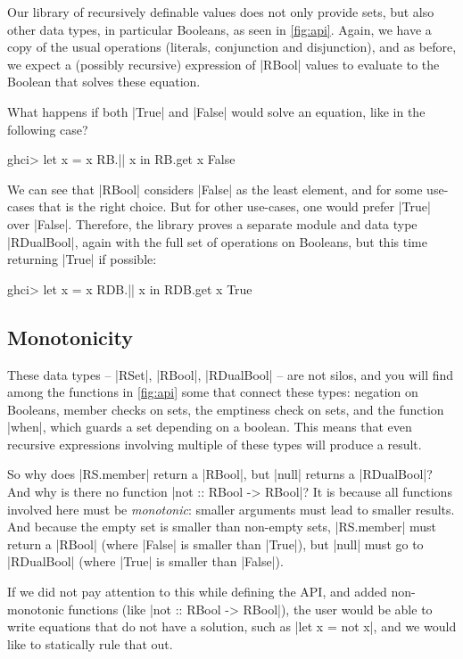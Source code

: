 \documentclass[manuscript,anonymous,screen,acmsmall]{acmart}
\begin{document}
Our library of recursively definable values does not only provide sets, but also other data types, in particular Booleans, as seen in \cref{fig:api}. Again, we have a copy of the usual operations (literals, conjunction and disjunction), and as before, we expect a (possibly recursive) expression of |RBool| values to evaluate to the Boolean that solves these equation.

What happens if both |True| and |False| would solve an equation, like in the following case?
\begin{code}
ghci> let x = x RB.|| x in RB.get x
False
\end{code}
We can see that |RBool| considers |False| as the least element, and for some use-cases that is the right choice. But for other use-cases, one would prefer |True| over |False|. Therefore, the library proves a separate module and data type |RDualBool|, again with the full set of operations on Booleans, but this time returning |True| if possible:
\begin{code}
ghci> let x = x RDB.|| x in RDB.get x
True
\end{code}

\subsection{Monotonicity}\label{sec:monotonicity}

These data types -- |RSet|, |RBool|, |RDualBool| -- are not silos, and you will find among the functions in \cref{fig:api} some that connect these types: negation on Booleans, member checks on sets, the emptiness check on sets, and the function |when|, which guards a set depending on a boolean.
This means that even recursive expressions involving multiple of these types will produce a result.

So why does |RS.member| return a |RBool|, but |null| returns a |RDualBool|? And why is there no function |not :: RBool -> RBool|? It is because all functions involved here must be \emph{monotonic}: smaller arguments must lead to smaller results. And because the empty set is smaller than non-empty sets, |RS.member| must return a |RBool| (where |False| is smaller than |True|), but |null| must go to |RDualBool| (where |True| is smaller than |False|).

If we did not pay attention to this while defining the API, and added non-monotonic functions (like |not :: RBool -> RBool|), the user would be  able to write equations that do not have a solution, such as
|let x = not x|,
and we would like to statically rule that out.
\end{document}
